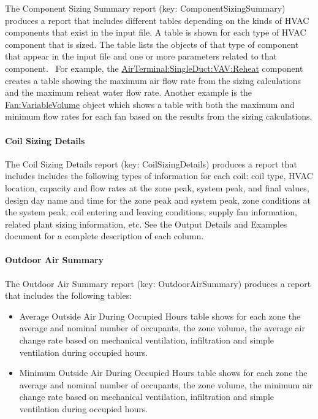 The Component Sizing Summary report (key: ComponentSizingSummary) produces a report that includes different tables depending on the kinds of HVAC components that exist in the input file. A table is shown for each type of HVAC component that is sized. The table lists the objects of that type of component that appear in the input file and one or more parameters related to that component.~ For example, the \hyperref[airterminalsingleductvavreheat]{AirTerminal:SingleDuct:VAV:Reheat} component creates a table showing the maximum air flow rate from the sizing calculations and the maximum reheat water flow rate. Another example is the \hyperref[fanvariablevolume]{Fan:VariableVolume} object which shows a table with both the maximum and minimum flow rates for each fan based on the results from the sizing calculations.

\paragraph{Coil Sizing Details}\label{coil-sizing-details}

The Coil Sizing Details report (key: CoilSizingDetails) produces a report that includes includes the following types of information for each coil: coil type, HVAC location, capacity and flow rates at the zone peak, system peak, and final values, design day name and time for the zone peak and system peak, zone conditions at the system peak, coil entering and leaving conditions, supply fan information, related plant sizing information, etc. See the Output Details and Examples document for a complete description of each column.

\paragraph{Outdoor Air Summary}\label{outdoor-air-summary}

The Outdoor Air Summary report (key: OutdoorAirSummary) produces a report that includes the following tables:

\begin{itemize}
\item
  Average Outside Air During Occupied Hours table shows for each zone the average and nominal number of occupants, the zone volume, the average air change rate based on mechanical ventilation, infiltration and simple ventilation during occupied hours.
\item
  Minimum Outside Air During Occupied Hours table shows for each zone the average and nominal number of occupants, the zone volume, the minimum air change rate based on mechanical ventilation, infiltration and simple ventilation during occupied hours.
\end{itemize}

